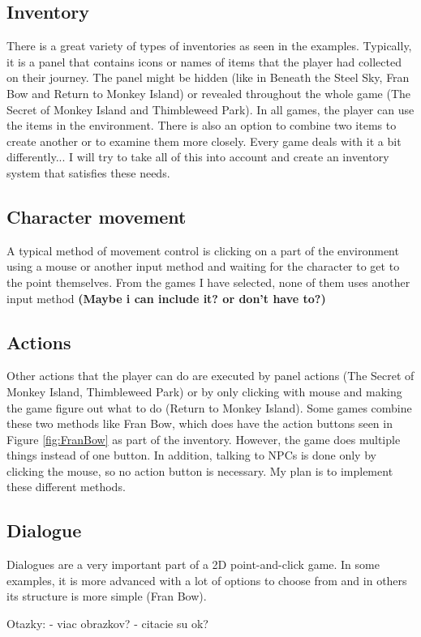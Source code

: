 \subsection{Inventory}
There is a great variety of types of inventories as seen in the examples. Typically, it is a panel that contains icons or names of items that the player had collected on their journey. The panel might be hidden (like in Beneath the Steel Sky, Fran Bow and Return to Monkey Island) or revealed throughout the whole game (The Secret of Monkey Island and Thimbleweed Park). In all games, the player can use the items in the environment. There is also an option to combine two items to create another or to examine them more closely. Every game deals with it a bit differently... 
I will try to take all of this into account and create an inventory system that satisfies these needs.

\subsection{Character movement}
A typical method of movement control is clicking on a part of the environment using a mouse or another input method and waiting for the character to get to the point themselves. From the games I have selected, none of them uses another input method  \textbf{(Maybe i can include it? or don't have to?)}

\subsection{Actions}
Other actions that the player can do are executed by panel actions (The Secret of Monkey Island, Thimbleweed Park) or by only clicking with mouse and making the game figure out what to do (Return to Monkey Island). Some games combine these two methods like Fran Bow, which does have the action buttons seen in Figure \ref{fig:FranBow} as part of the inventory. However, the game does multiple things instead of one button. In addition, talking to NPCs is done only by clicking the mouse, so no action button is necessary. My plan is to implement these different methods.

\subsection{Dialogue}
Dialogues are a very important part of a 2D point-and-click game. In some examples, it is more advanced with a lot of options to choose from and in others its structure is more simple (Fran Bow).  


Otazky:
- viac obrazkov?
- citacie su ok?